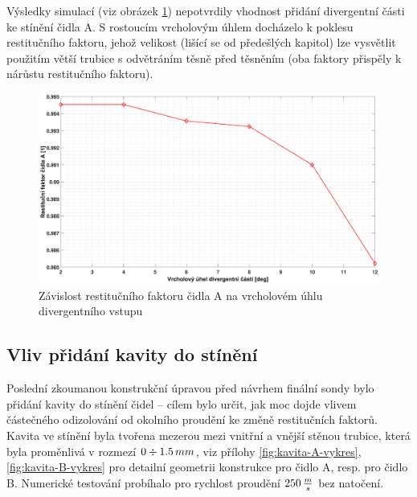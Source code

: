         Výsledky simulací (viz obrázek \ref{fig:divergentni-cast-A}) nepotvrdily vhodnost přidání divergentní části ke stínění čidla A. S rostoucím vrcholovým úhlem docházelo k poklesu restitučního faktoru, jehož velikost (lišící se od předešlých kapitol) lze vysvětlit použitím větší trubice s odvětráním těsně před těsněním (oba faktory přispěly k nárůstu restitučního faktoru).
    
        \begin{figure}[ht!]
            \centering
            \includegraphics*[width=\textwidth, trim={5.25cm 1.0cm 5.8cm 2.0cm}]{400_SIMULACE_KONSTRUKCNICH_UPRAV/Grafy/08_divergentni_cast_A.eps}
            \caption{Závislost restitučního faktoru čidla A na vrcholovém úhlu divergentního vstupu}
            \label{fig:divergentni-cast-A}
        \end{figure}
    
    \newpage
    \subsection{Vliv přidání kavity do stínění} \label{sec:kavita}
        Poslední zkoumanou konstrukční úpravou před návrhem finální sondy bylo přidání kavity do stínění čidel – cílem bylo určit, jak moc dojde vlivem částečného odizolování od okolního proudění ke změně restitučních faktorů. Kavita ve stínění byla tvořena mezerou mezi vnitřní a vnější stěnou trubice, která byla proměnlivá v rozmezí $0 \div 1.5 \, mm$, viz přílohy \ref{fig:kavita-A-vykres}, \ref{fig:kavita-B-vykres} pro detailní geometrii konstrukce pro čidlo A, resp. pro čidlo B. Numerické testování probíhalo pro rychlost proudění $250 \, \frac{m}{s}$ bez natočení.

